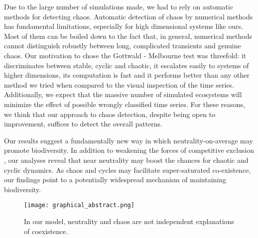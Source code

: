 Due to the large number of simulations made, we had to rely on automatic methods for detecting chaos. Automatic detection of chaos by numerical methods has fundamental limitations, especially for high dimensional systems like ours. Most of them can be boiled down to the fact that, in general, numerical methods cannot distinguish robustly between long, complicated transients and genuine chaos. Our motivation to chose the Gottwald - Melbourne test \citep{Gottwald2009} was threefold: it discriminates between stable, cyclic and chaotic, it escalates easily to systems of higher dimensions, its computation is fast and it performs better than any other method we tried when compared to the visual inspection of the time series. Additionally, we expect that the massive number of simulated ecosystems will minimize the effect of possible wrongly classified time series. For these reasons, we think that our approach to chaos detection, despite being open to improvement, suffices to detect the overall patterns.

Our results suggest a fundamentally new way in which neutrality-on-average may promote biodiversity. In addition to weakening the forces of competitive exclusion \citep{Scheffer2018}, our analyses reveal that near neutrality may boost the chances for chaotic and cyclic dynamics. As chaos and cycles may facilitate super-saturated co-existence, our findings point to a potentially widespread mechanism of maintaining biodiversity.

\begin{figure}
	\begin{center}
		\texttt{[image: graphical\_abstract.png]}
	\end{center}
	\caption{In our model, neutrality and chaos are not independent explanations of coexistence.}
	\label{fig:GapInKnowledge}
\end{figure}
